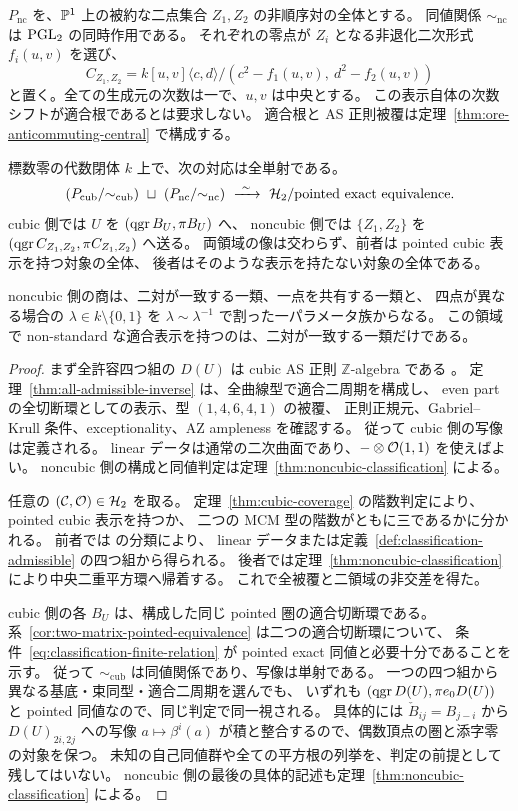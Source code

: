 $P_{\mathrm{nc}}$ を、$\mathbb P^1$ 上の被約な二点集合 $Z_1,Z_2$ の非順序対の全体とする。
同値関係 $\sim_{\mathrm{nc}}$ は $\operatorname{PGL}_2$ の同時作用である。
それぞれの零点が $Z_i$ となる非退化二次形式 $f_i(u,v)$ を選び、
\[
 C_{Z_1,Z_2}=k[u,v]\langle c,d\rangle/
       (c^2-f_1(u,v),\ d^2-f_2(u,v))
\]
と置く。全ての生成元の次数は一で、$u,v$ は中央とする。
この表示自体の次数シフトが適合根であるとは要求しない。
適合根と AS 正則被覆は定理~\ref{thm:ore-anticommuting-central} で構成する。

\begin{theorem}
\label{thm:complete-h2-classification}
標数零の代数閉体 $k$ 上で、次の対応は全単射である。
\[
 (P_{\mathrm{cub}}/{\sim_{\mathrm{cub}}})
 \ \sqcup\ (P_{\mathrm{nc}}/{\sim_{\mathrm{nc}}})
 \ \xrightarrow{\ \sim\ }\ 
 \HH/{\text{pointed exact equivalence}}.
\]
cubic 側では $U$ を $(\operatorname{qgr} B_U,\pi B_U)$ へ、
noncubic 側では $\{Z_1,Z_2\}$ を
$(\operatorname{qgr} C_{Z_1,Z_2},\pi C_{Z_1,Z_2})$ へ送る。
両領域の像は交わらず、前者は pointed cubic 表示を持つ対象の全体、
後者はそのような表示を持たない対象の全体である。

noncubic 側の商は、二対が一致する一類、一点を共有する一類と、
四点が異なる場合の $\lambda\in k\setminus\{0,1\}$ を
$\lambda\sim\lambda^{-1}$ で割った一パラメータ族からなる。
この領域で non-standard な適合表示を持つのは、二対が一致する一類だけである。
\end{theorem}

\begin{proof}
まず全許容四つ組の $D(U)$ は cubic AS 正則 $\mathbb Z$-algebra である
\cite[arXiv v3, Theorems 5.5.7--5.5.10]{VdB2011}。
定理~\ref{thm:all-admissible-inverse} は、全曲線型で適合二周期を構成し、
even part の全切断環としての表示、型 $(1,4,6,4,1)$ の被覆、
正則正規元、Gabriel--Krull 条件、exceptionality、AZ ampleness を確認する。
従って cubic 側の写像は定義される。
linear データは通常の二次曲面であり、$-\otimes\mathcal O(1,1)$ を使えばよい。
noncubic 側の構成と同値判定は定理~\ref{thm:noncubic-classification} による。

任意の $(\mathcal C,\mathcal O)\in\mathcal H_2$ を取る。
定理~\ref{thm:cubic-coverage} の階数判定により、pointed cubic 表示を持つか、
二つの MCM 型の階数がともに三であるかに分かれる。
前者では \cite[arXiv v3, Theorem 5.5.10]{VdB2011} の分類により、
linear データまたは定義~\ref{def:classification-admissible} の四つ組から得られる。
後者では定理~\ref{thm:noncubic-classification} により中央二重平方環へ帰着する。
これで全被覆と二領域の非交差を得た。

cubic 側の各 $B_U$ は、構成した同じ pointed 圏の適合切断環である。
系~\ref{cor:two-matrix-pointed-equivalence} は二つの適合切断環について、
条件~\eqref{eq:classification-finite-relation} が
pointed exact 同値と必要十分であることを示す。
従って $\sim_{\mathrm{cub}}$ は同値関係であり、写像は単射である。
一つの四つ組から異なる基底・束同型・適合二周期を選んでも、
いずれも $(\operatorname{qgr} D(U),\pi e_0D(U))$ と pointed 同値なので、同じ判定で同一視される。
具体的には $\check B_{ij}=B_{j-i}$ から $D(U)_{2i,2j}$ への写像
$a\mapsto\beta^i(a)$ が積と整合するので、偶数頂点の圏と添字零の対象を保つ。
未知の自己同値群や全ての平方根の列挙を、判定の前提として残してはいない。
noncubic 側の最後の具体的記述も定理~\ref{thm:noncubic-classification} による。
\end{proof}

